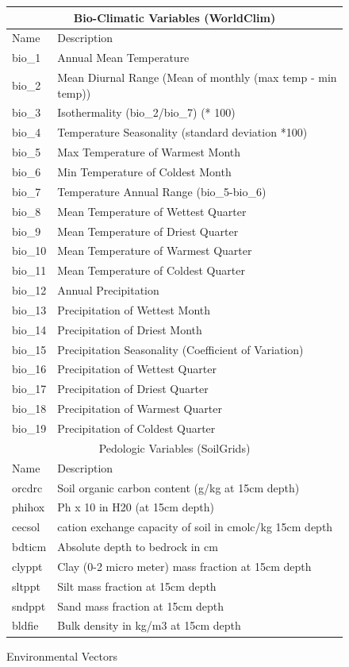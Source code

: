 \documentclass[12pt, oneside]{article}
\begin{document}
\begin{normalsize}
\begin{figure}[H]
\caption{Environmental Vectors}
\centering
\scriptsize
\begin{tabular}{ |l|l| }
\hline
\multicolumn{2}{|c|}{Bio-Climatic Variables (WorldClim) \cite{hijmans2005very}}\\
\hline
Name & Description \\
\hline
bio\_1 & Annual Mean Temperature \\
bio\_2 & Mean Diurnal Range (Mean of monthly (max temp - min temp)) \\
bio\_3 & Isothermality (bio\_2/bio\_7) (* 100) \\
bio\_4 & Temperature Seasonality (standard deviation *100) \\
bio\_5 & Max Temperature of Warmest Month \\
bio\_6 & Min Temperature of Coldest Month \\
bio\_7 & Temperature Annual Range (bio\_5-bio\_6) \\
bio\_8 & Mean Temperature of Wettest Quarter \\
bio\_9 & Mean Temperature of Driest Quarter \\
bio\_10 & Mean Temperature of Warmest Quarter \\
bio\_11 & Mean Temperature of Coldest Quarter \\
bio\_12 & Annual Precipitation \\
bio\_13 & Precipitation of Wettest Month \\
bio\_14 & Precipitation of Driest Month \\
bio\_15 & Precipitation Seasonality (Coefficient of Variation) \\
bio\_16 & Precipitation of Wettest Quarter \\
bio\_17 & Precipitation of Driest Quarter \\
bio\_18 & Precipitation of Warmest Quarter \\
bio\_19 & Precipitation of Coldest Quarter \\
\hline
\multicolumn{2}{|c|}{Pedologic Variables (SoilGrids) \cite{hengl2017soilgrids250m}} \\
\hline
Name & Description \\
\hline
orcdrc & Soil organic carbon content (g/kg at 15cm depth) \\
phihox & Ph x 10 in H20 (at 15cm depth) \\
cecsol & cation exchange capacity of soil in cmolc/kg 15cm depth \\
bdticm & Absolute depth to bedrock in cm \\
clyppt & Clay (0-2 micro meter) mass fraction at 15cm depth \\
sltppt & Silt mass fraction at 15cm depth \\
sndppt & Sand mass fraction at 15cm depth \\
bldfie & Bulk density in kg/m3 at 15cm depth \\
 \hline
\end{tabular}
\end{figure}


\end{normalsize}
\end{document}
